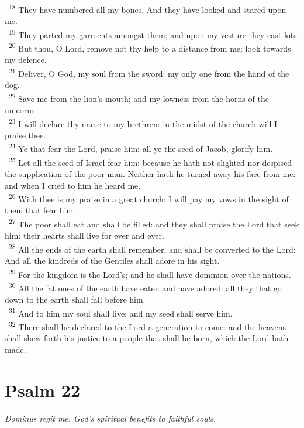 \documentclass[a5paper,12pt]{article}
\begin{document}
\begin{multicols*}{2}
~\textsuperscript{18} They have numbered all my bones. And they have looked and stared upon me.\\
~\textsuperscript{19} They parted my garments amongst them; and upon my vesture they cast lots.\\
~\textsuperscript{20} But thou, O Lord, remove not thy help to a distance from me; look towards my defence.\\
~\textsuperscript{21} Deliver, O God, my soul from the sword: my only one from the hand of the dog.\\
~\textsuperscript{22} Save me from the lion's mouth; and my lowness from the horns of the unicorns.\\
~\textsuperscript{23} I will declare thy name to my brethren: in the midst of the church will I praise thee.\\
~\textsuperscript{24} Ye that fear the Lord, praise him: all ye the seed of Jacob, glorify him.\\
~\textsuperscript{25} Let all the seed of Israel fear him: because he hath not slighted nor despised the supplication of the poor man. Neither hath he turned away his face from me: and when I cried to him he heard me.\\
~\textsuperscript{26} With thee is my praise in a great church: I will pay my vows in the sight of them that fear him.\\
~\textsuperscript{27} The poor shall eat and shall be filled: and they shall praise the Lord that seek him: their hearts shall live for ever and ever.\\
~\textsuperscript{28} All the ends of the earth shall remember, and shall be converted to the Lord: And all the kindreds of the Gentiles shall adore in his sight.\\
~\textsuperscript{29} For the kingdom is the Lord's; and he shall have dominion over the nations.\\
~\textsuperscript{30} All the fat ones of the earth have eaten and have adored: all they that go down to the earth shall fall before him.\\
~\textsuperscript{31} And to him my soul shall live: and my seed shall serve him.\\
~\textsuperscript{32} There shall be declared to the Lord a generation to come: and the heavens shall shew forth his justice to a people that shall be born, which the Lord hath made.\\

\section{Psalm 22}
\label{sec:orga5f26ca}
\emph{Dominus regit me. God's spiritual benefits to faithful souls.}\\


\end{multicols*}
\end{document}
